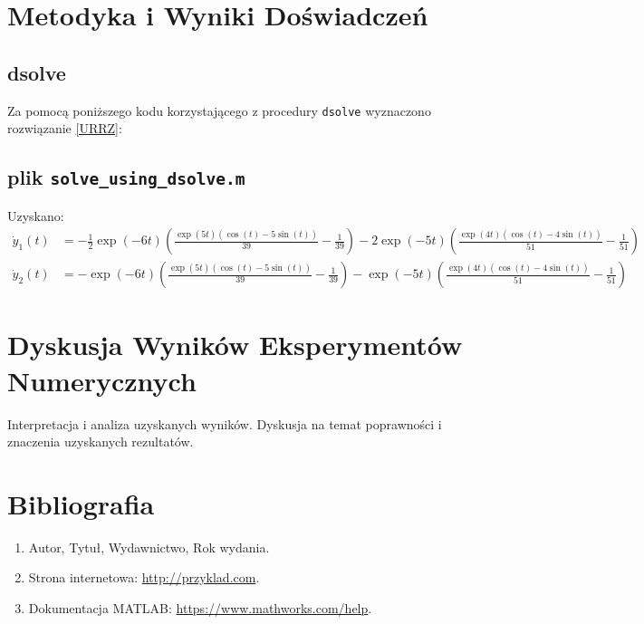 \documentclass[a4paper, 12pt, twoside, openany]{article}
\begin{document}
    \newpage

    \section{Metodyka i Wyniki Doświadczeń}
    \subsection{dsolve}
    Za pomocą poniższego kodu korzystającego z procedury \texttt{dsolve} wyznaczono rozwiązanie \eqref{URRZ}:
    \subsection*{plik \texttt{solve\_using\_dsolve.m}}
    
    Uzyskano:
    \small
    $$ \begin{aligned}
    \dot{y}_1(t) &= - \frac{1}{2}\exp(-6 t) \left( \frac{\exp(5 t) \left( \cos(t) - 5 \sin(t) \right)}{39} - \frac{1}{39} \right) - 2 \exp(-5 t) \left( \frac{\exp(4 t) \left( \cos(t) - 4 \sin(t) \right)}{51} - \frac{1}{51} \right) \\
    \dot{y}_2(t) &= - \exp(-6 t) \left( \frac{\exp(5 t) \left( \cos(t) - 5 \sin(t) \right)}{39} - \frac{1}{39} \right) - \exp(-5 t) \left( \frac{\exp(4 t) \left( \cos(t) - 4 \sin(t) \right)}{51} - \frac{1}{51} \right)
    \end{aligned} $$
    \section{Dyskusja Wyników Eksperymentów Numerycznych}
    Interpretacja i analiza uzyskanych wyników. Dyskusja na temat poprawności i znaczenia uzyskanych rezultatów.

    \newpage

    \section*{Bibliografia}
    \begin{enumerate}
        \item Autor, Tytuł, Wydawnictwo, Rok wydania.
        \item Strona internetowa: \url{http://przyklad.com}.
        \item Dokumentacja MATLAB: \url{https://www.mathworks.com/help}.
    \end{enumerate}
\end{document}
